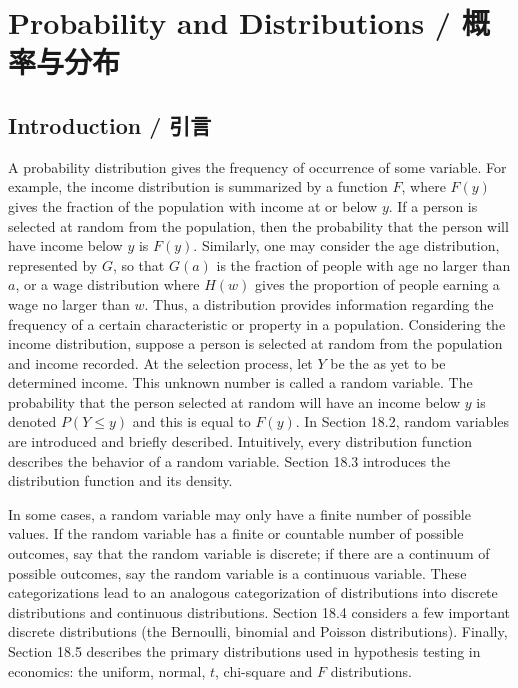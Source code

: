 \chapter{Probability and Distributions / 概率与分布}

\section{Introduction / 引言}

\begin{original}
A probability distribution gives the frequency of occurrence of some variable. For example, the income distribution is summarized by a function $F$, where $F(y)$ gives the fraction of the population with income at or below $y$. If a person is selected at random from the population, then the probability that the person will have income below $y$ is $F(y)$. Similarly, one may consider the age distribution, represented by $G$, so that $G(a)$ is the fraction of people with age no larger than $a$, or a wage distribution where $H(w)$ gives the proportion of people earning a wage no larger than $w$. Thus, a distribution provides information regarding the frequency of a certain characteristic or property in a population. Considering the income distribution, suppose a person is selected at random from the population and income recorded. At the selection process, let $Y$ be the as yet to be determined income. This unknown number is called a random variable. The probability that the person selected at random will have an income below $y$ is denoted $P(Y \leq y)$ and this is equal to $F(y)$. In Section 18.2, random variables are introduced and briefly described. Intuitively, every distribution function describes the behavior of a random variable. Section 18.3 introduces the distribution function and its density.

In some cases, a random variable may only have a finite number of possible values. If the random variable has a finite or countable number of possible outcomes, say that the random variable is discrete; if there are a continuum of possible outcomes, say the random variable is a continuous variable. These categorizations lead to an analogous categorization of distributions into discrete distributions and continuous distributions. Section 18.4 considers a few important discrete distributions (the Bernoulli, binomial and Poisson distributions). Finally, Section 18.5 describes the primary distributions used in hypothesis testing in economics: the uniform, normal, $t$, chi-square and $F$ distributions.
\end{original}
